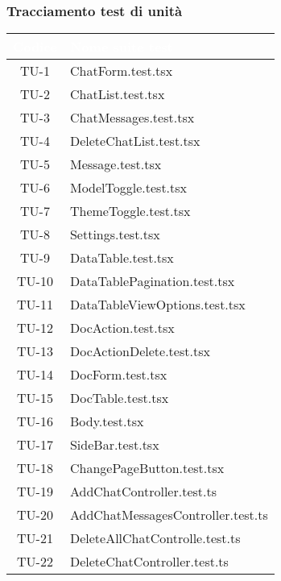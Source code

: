 \endgroup

\subsubsection{Tracciamento test di unità}


\begingroup
\setlength{\tabcolsep}{10pt}
\renewcommand{\arraystretch}{1.5}
\begin{xltabular}{0.7\textwidth}{| c | X |}
    \hline
     \textbf{\textcolor{white}{Codice}} & \textbf{\textcolor{white}{Nome suite test}} \\
    \hline
    \endhead
    TU-1 & ChatForm.test.tsx \\
    \hline
    TU-2 & ChatList.test.tsx \\
    \hline
    TU-3 & ChatMessages.test.tsx \\
    \hline
    TU-4 & DeleteChatList.test.tsx \\
    \hline
    TU-5 & Message.test.tsx \\
    \hline
    TU-6 & ModelToggle.test.tsx \\
    \hline
    TU-7 & ThemeToggle.test.tsx \\
    \hline
    TU-8 & Settings.test.tsx \\
    \hline
    TU-9 & DataTable.test.tsx \\
    \hline
    TU-10 & DataTablePagination.test.tsx \\
    \hline
    TU-11 & DataTableViewOptions.test.tsx \\
    \hline
    TU-12 & DocAction.test.tsx \\
    \hline
    TU-13 & DocActionDelete.test.tsx \\
    \hline
    TU-14 & DocForm.test.tsx \\
    \hline
    TU-15 & DocTable.test.tsx \\
    \hline
    TU-16 & Body.test.tsx \\
    \hline
    TU-17 & SideBar.test.tsx \\
    \hline
    TU-18 & ChangePageButton.test.tsx \\
    \hline
    TU-19 & AddChatController.test.ts \\
    \hline
    TU-20 & AddChatMessagesController.test.ts \\
    \hline
    TU-21 & DeleteAllChatControlle.test.ts \\
    \hline
    TU-22 & DeleteChatController.test.ts \\
    \hline

\end{xltabular}
